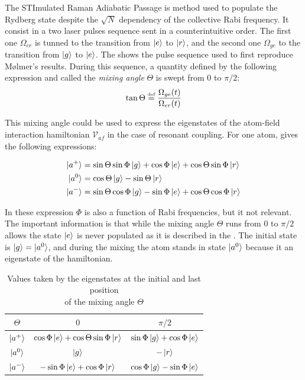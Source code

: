 \documentclass[twoside, open=right
]{scrreprt}
\newcommand{\defi}{\xspace\ensuremath{\overset{\text{\tiny def}}{=}}\xspace}
\newcommand{\ff}{\ensuremath{\ket{g}}\xspace}
\newcommand{\ee}{\ensuremath{\ket{e}}\xspace}
\newcommand{\rr}{\ensuremath{\ket{r}}\xspace}
\newcommand{\Om}{\Omega}
\newcommand{\mc}[1]{\mathcal{#1}}
\newcommand{\Th}{\Theta}
\begin{document}
\par The STImulated Raman Adiabatic Passage is method used to populate the Rydberg state despite the $\sqrt{N}$ dependency of the collective Rabi frequency. It consist in a two laser pulses sequence sent in a counterintuitive order. The first one $\Om_{er}$ is tunned to the transition from \ee to \rr, and the second one $\Om_{ge}$ to the transition from \ff to \ee. The  shows the pulse sequence used to first reproduce Mølmer's results. During this sequence, a quantity defined by the following expression and called the \emph{mixing angle} $\Theta$ is swept from $0$ to $\pi/2$: \[ \tan \Theta \defi \frac{\Om_{ge}(t)}{\Om_{er}(t)} \]

\par This mixing angle could be used to express the eigenstates of the atom-field interaction hamiltonian $\mc{V}_{af}$ in the case of resonant coupling. For one atom, \cite{Berg} gives the following expressions: 

\begin{align*}
\ket{a^+} &= \sin \Th \sin \Phi \ff + \cos \Phi \ee + \cos \Th \sin \Phi \rr \\
\ket{a^0} &= \cos \Th \ff - \sin \Th \rr \\
\ket{a^-} &= \sin \Th \cos \Phi \ff - \sin \Phi \ee + \cos \Th \cos \Phi \rr
\end{align*}

\par In these expression $\Phi$ is also a function of Rabi frequencies, but it not relevant. The important information is that while the mixing angle $\Th$ runs from $0$ to $\pi/2$ allows the state \ee is never populated as it is described in the . The initial state is $\ff = \ket{a^0}$, and during the mixing the atom stands in state $\ket{a^0}$ because it an eigenstate of the hamiltonian.

\begin{table}[h]
  \centering
  \begin{tabular}{||c||c c||}
    \hline
    $\Th$ & $0$ & $\pi/2$\\
    \hline \hline
    $\ket{a^+}$ & $\cos \Phi \ee + \cos \Th \sin \Phi \rr$ & $\sin \Phi \ff + \cos \Phi \ee$\\
    $\ket{a^0}$ & $\ff$ & $-\rr$\\
    $\ket{a^-}$ & $- \sin \Phi \ee + \cos \Phi \rr$ & $\cos \Phi \ff - \sin \Phi \ee$\\
    \hline
  \end{tabular}
  \caption{\label{sweeping} Values taken by the eigenstates at the initial and last position \\ of the mixing angle $\Th$}
\end{table}
\end{document}
